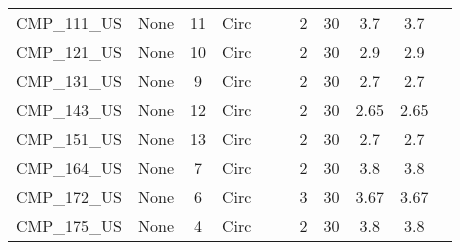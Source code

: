 \begin{table}[]
\begin{tabular}{@{}lcccccccccc@{}}
CMP\_111\_US  & None       & 11       & Circ &        &       & 2        & 30     & 3.7       & 3.7        \\
CMP\_121\_US  & None       & 10       & Circ &        &       & 2        & 30     & 2.9       & 2.9        \\
CMP\_131\_US  & None       & 9        & Circ &        &       & 2        & 30     & 2.7       & 2.7        \\
CMP\_143\_US  & None       & 12       & Circ &        &       & 2        & 30     & 2.65      & 2.65       \\
CMP\_151\_US  & None       & 13       & Circ &        &       & 2        & 30     & 2.7       & 2.7        \\
CMP\_164\_US  & None       & 7        & Circ &        &       & 2        & 30     & 3.8       & 3.8        \\
CMP\_172\_US  & None       & 6        & Circ &        &       & 3        & 30     & 3.67      & 3.67       \\
CMP\_175\_US  & None       & 4        & Circ &        &       & 2        & 30     & 3.8       & 3.8        \\
\bottomrule
\end{tabular}
\end{table}

